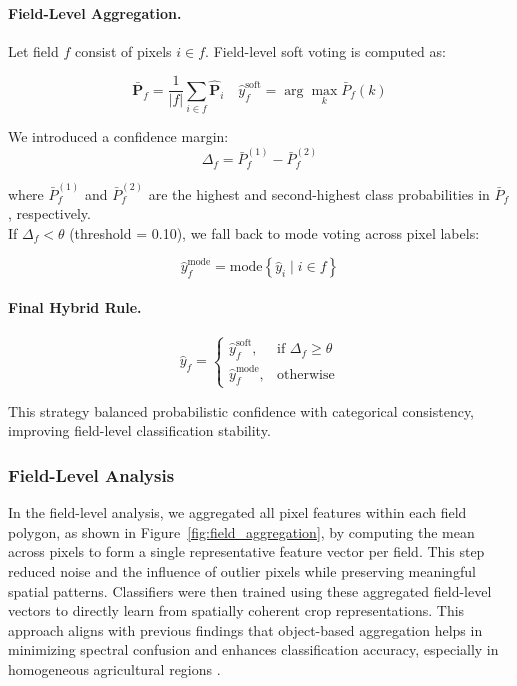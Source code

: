\documentclass[pdflatex,sn-mathphys]{sn-jnl} %
\begin{document}
\paragraph{Field-Level Aggregation.}

Let field \( f \) consist of pixels \( i \in f \). Field-level soft voting is computed as:

\[
\bar{\mathbf{P}}_f = \frac{1}{|f|} \sum_{i \in f} \hat{\mathbf{P}}_i
\quad
\hat{y}_f^{\text{soft}} = \arg\max_k \bar{P}_f(k)
\]

We introduced a confidence margin:
\[
\Delta_f = \bar{P}_f^{(1)} - \bar{P}_f^{(2)}
\]

where \(\bar{P}_f^{(1)}\) and \(\bar{P}_f^{(2)}\) are the highest and second-highest class probabilities in \(\bar{P}_f\), respectively.\\

If \( \Delta_f < \theta \) (threshold = 0.10), we fall back to mode voting across pixel labels:

\[
\hat{y}_f^{\text{mode}} = \text{mode} \left\lbrace \hat{y}_i \mid i \in f \right\rbrace
\]

\paragraph{Final Hybrid Rule.}
\[
\hat{y}_f =
\begin{cases}
\hat{y}_f^{\text{soft}}, & \text{if } \Delta_f \geq \theta \\
\hat{y}_f^{\text{mode}}, & \text{otherwise}
\end{cases}
\]

This strategy balanced probabilistic confidence with categorical consistency, improving field-level classification stability.

\subsubsection{Field-Level Analysis}
In the field-level analysis, we aggregated all pixel features within each field polygon, as shown in Figure~\ref{fig:field_aggregation}, by computing the mean across pixels to form a single representative feature vector per field. This step reduced noise and the influence of outlier pixels while preserving meaningful spatial patterns. Classifiers were then trained using these aggregated field-level vectors to directly learn from spatially coherent crop representations. This approach aligns with previous findings that object-based aggregation helps in minimizing spectral confusion and enhances classification accuracy, especially in homogeneous agricultural regions \cite{penabarragan2011}.
\end{document}
